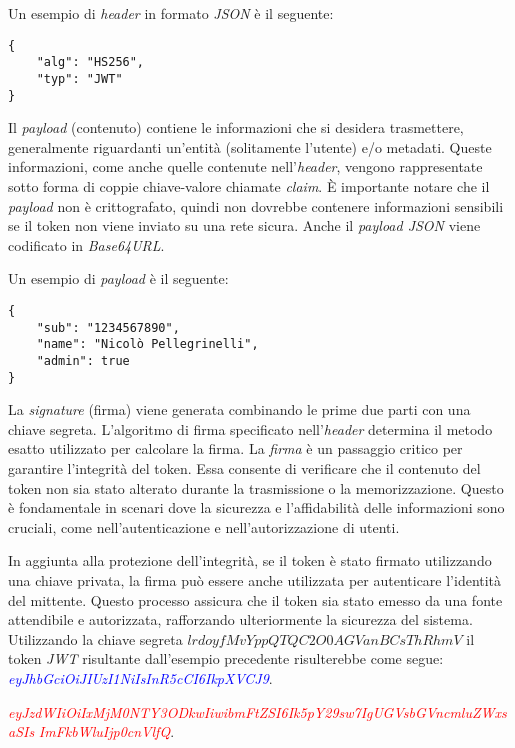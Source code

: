 \noindent Un esempio di \emph{header} in formato \emph{JSON} è il seguente:
\begin{verbatim}
{
	"alg": "HS256",
	"typ": "JWT"
}
\end{verbatim}

Il \emph{payload} (contenuto) contiene le informazioni che si desidera trasmettere, generalmente riguardanti un'entità (solitamente l'utente) e/o metadati.
Queste informazioni, come anche quelle contenute nell'\emph{header}, vengono rappresentate sotto forma di coppie chiave-valore chiamate \emph{claim}.
È importante notare che il \emph{payload} non è crittografato, quindi non dovrebbe contenere informazioni sensibili se il token non viene inviato su una rete sicura.
Anche il \emph{payload JSON} viene codificato in \emph{Base64URL}.

\noindent Un esempio di \emph{payload} è il seguente:
\begin{verbatim}
{
	"sub": "1234567890",
	"name": "Nicolò Pellegrinelli",
	"admin": true
}
\end{verbatim}

La \emph{signature} (firma) viene generata combinando le prime due parti con una chiave segreta.
L'algoritmo di firma specificato nell'\emph{header} determina il metodo esatto utilizzato per calcolare la firma.
La \emph{firma} è un passaggio critico per garantire l'integrità del token.
Essa consente di verificare che il contenuto del token non sia stato alterato durante la trasmissione o la memorizzazione.
Questo è fondamentale in scenari dove la sicurezza e l'affidabilità delle informazioni sono cruciali, come nell'autenticazione e nell'autorizzazione di utenti.

In aggiunta alla protezione dell'integrità, se il token è stato firmato utilizzando una chiave privata, la firma può essere anche utilizzata per autenticare l'identità del mittente.
Questo processo assicura che il token sia stato emesso da una fonte attendibile e autorizzata, rafforzando ulteriormente la sicurezza del sistema.\\

Utilizzando la chiave segreta $lrdoyfMvYppQTQC2O0AGVanBCsThRhmV$ il token \emph{JWT} risultante dall'esempio precedente risulterebbe come segue: \\


\noindent \emph{\textcolor{blue}{eyJhbGciOiJIUzI1NiIsInR5cCI6IkpXVCJ9}}.

\noindent \emph{\textcolor{red}{eyJzdWIiOiIxMjM0NTY3ODkwIiwibmFtZSI6Ik5pY29sw7IgUGVsbGVncmluZWxsaSIs}}
\noindent \emph{\textcolor{red}{ImFkbWluIjp0cnVlfQ}}.

